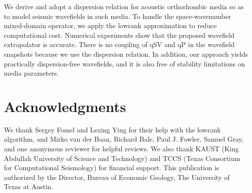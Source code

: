 We derive and adopt a dispersion relation 
for acoustic orthorhombic media so as to model seismic wavefields in such media.
To handle the space-wavenumber mixed-domain operator, 
we apply the lowrank approximation to reduce computational cost.
Numerical experiments show that the proposed wavefield extrapolator is accurate.
There is no coupling of qSV and qP in the wavefield snapshots 
because we use the dispersion relation. 
In addition, our approach yields practically 
dispersion-free wavefields, and 
it is also free of stability limitations on media parameters.


\section{Acknowledgments}
We thank Sergey Fomel and Lexing Ying for their help with the lowrank algorithm, and Mirko van der Baan, Richard Bale, Paul J. Fowler, Samuel Gray, and one anonymous reviewer for helpful reviews. 
We also thank KAUST (King Abdullah University of Science and Technology) and TCCS (Texas Consortium for Computational Seismology) for financial support.
This publication is authorized by the Director, Bureau of Economic
Geology, The University of Texas at Austin.



%
